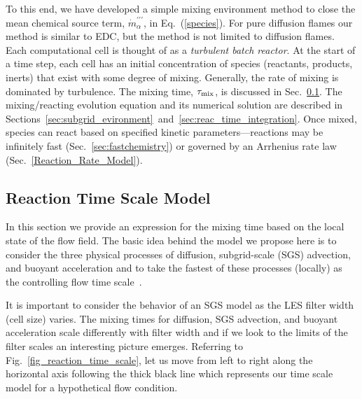To this end, we have developed a simple mixing environment method to close the mean chemical source term, $\dot{m}^{\prime\prime\prime}_{\alpha}$, in Eq.~(\ref{species}).  For pure diffusion flames our method is similar to EDC, but the method is not limited to diffusion flames.  Each computational cell is thought of as a {\em turbulent batch reactor}. At the start of a time step, each cell has an initial concentration of species (reactants, products, inerts) that exist with some degree of mixing. Generally, the rate of mixing is dominated by turbulence. The mixing time, $\tau_{\rm mix}$, is discussed in Sec.~\ref{sec:reac_time_scale}. The mixing/reacting evolution equation and its numerical solution are described in Sections~\ref{sec:subgrid_evironment}~and~\ref{sec:reac_time_integration}. Once mixed, species can react based on specified kinetic parameters---reactions may be infinitely fast (Sec.~\ref{sec:fastchemistry}) or governed by an Arrhenius rate law (Sec.~\ref{Reaction_Rate_Model}).


\subsection{Reaction Time Scale Model}
\label{sec:reac_time_scale}

In this section we provide an expression for the mixing time based on the local state of the flow field.  The basic idea behind the model we propose here is to consider the three physical processes of diffusion, subgrid-scale (SGS) advection, and buoyant acceleration and to take the fastest of these processes (locally) as the controlling flow time scale~\cite{McDermott:2011}.

It is important to consider the behavior of an SGS model as the LES filter width (cell size) varies. The mixing times for diffusion, SGS advection, and buoyant acceleration scale differently with filter width and if we look to the limits of the filter scales an interesting picture emerges.  Referring to Fig.~\ref{fig_reaction_time_scale}, let us move from left to right along the horizontal axis following the thick black line which represents our time scale model for a hypothetical flow condition.

